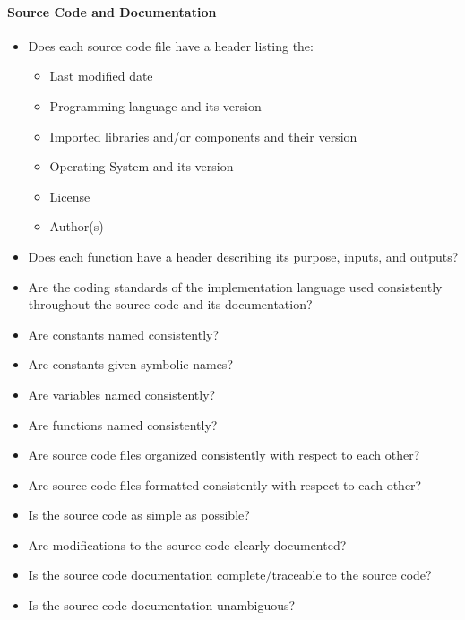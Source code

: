 \paragraph{Source Code and Documentation}
\begin{itemize}

    \item Does each source code file have a header listing the:
    \begin{itemize}
        \item Last modified date
        \item Programming language and its version
        \item Imported libraries and/or components and their version
        \item Operating System and its version
        \item License
        \item Author(s)
    \end{itemize}

    \item Does each function have a header describing its purpose, inputs, and
    outputs?

    \item Are the coding standards of the implementation language used
    consistently throughout the source code and its documentation?

    \item Are constants named consistently?

    \item Are constants given symbolic names?

    \item Are variables named consistently?

    \item Are functions named consistently?

    \item Are source code files organized consistently with respect to each
    other?

    \item Are source code files formatted consistently with respect to each
    other?

    \item Is the source code as simple as possible?

    \item Are modifications to the source code clearly documented?

    \item Is the source code documentation complete/traceable to the source
    code?

    \item Is the source code documentation unambiguous?

\end{itemize}

